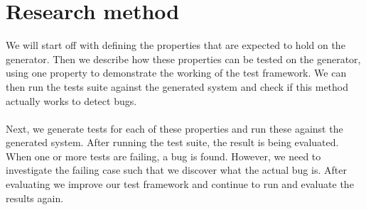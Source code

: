 \section{Research method}
We will start off with defining the properties that are expected to hold on the
generator. Then we describe how these properties can be tested on the generator,
using one property to demonstrate the working of the test framework. We can then
run the tests suite against the generated system and check if this method
actually works to detect bugs.\\
\\
Next, we generate tests for each of these properties and run these against the
generated system. After running the test suite, the result is being evaluated.
When one or more tests are failing, a bug is found. However, we need to
investigate the failing case such that we discover what the actual bug is. After
evaluating we improve our test framework and continue to run and evaluate the
results again.

